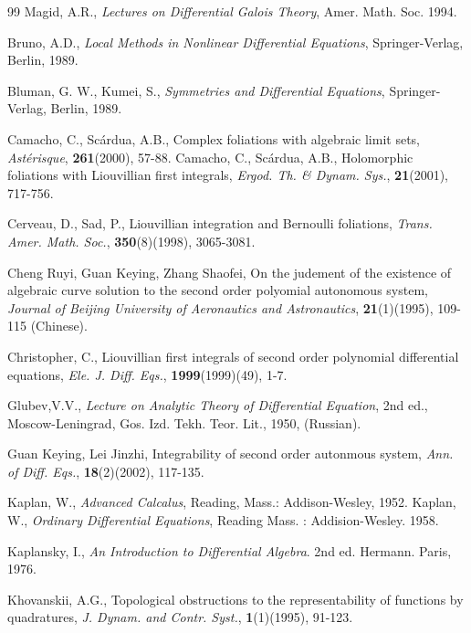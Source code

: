 \documentclass[preprint, 12pt]{elsarticle}
\numberwithin{equation}{section}
\begin{document}

\begin{thebibliography}{99}
 Magid, A.R., \textit{Lectures on Differential Galois
Theory}, Amer. Math. Soc. 1994.

 Bruno, A.D., \textit{Local Methods in Nonlinear Differential
Equations}, Springer-Verlag, Berlin, 1989.

 Bluman, G. W., Kumei, S., \textit{Symmetries and Differential Equations}, Springer-Verlag, Berlin, 1989.

 Camacho, C., Sc\'{a}rdua, A.B., Complex foliations
with algebraic limit sets, \textit{Ast\'{e}risque},
\textbf{261}(2000), 57-88.
 Camacho, C., Sc\'{a}rdua, A.B., Holomorphic foliations with Liouvillian
first integrals, \textit{Ergod. Th. \& Dynam. Sys.}, \textbf{21}(2001), 717-756.

 Cerveau, D., Sad, P., Liouvillian integration and Bernoulli foliations,
\textit{Trans. Amer. Math. Soc.}, \textbf{350}(8)(1998),
3065-3081.

 Cheng Ruyi, Guan Keying, Zhang Shaofei, On the
judement of the existence of algebraic curve solution to the
second order polyomial autonomous system, \textit{Journal of
Beijing University of Aeronautics and Astronautics},
\textbf{21}(1)(1995), 109-115 (Chinese).

 Christopher, C., Liouvillian first integrals of
second order polynomial differential equations, \textit{Ele. J.
Diff. Eqs.}, \textbf{1999}(1999)(49), 1-7.

 Glubev,V.V., \textit{Lecture on Analytic Theory of Differential
Equation}, 2nd ed., Moscow-Leningrad, Gos. Izd. Tekh. Teor. Lit.,
1950, (Russian).

 Guan Keying, Lei Jinzhi, Integrability of second
order autonmous system, \textit{Ann. of Diff. Eqs.},
\textbf{18}(2)(2002), 117-135.

 Kaplan, W., \textit{Advanced Calcalus},
 Reading, Mass.: Addison-Wesley,  1952.
 Kaplan,  W., \textit{Ordinary Differential
Equations}, Reading Mass. : Addision-Wesley. 1958.

 Kaplansky, I., \textit{An Introduction to Differential Algebra}.
2nd ed. Hermann. Paris, 1976.

 Khovanskii, A.G., Topological obstructions to the
representability of functions by quadratures, \textit{J. Dynam.
and Contr. Syst.}, \textbf{1}(1)(1995), 91-123.


\end{thebibliography}
\end{document}
